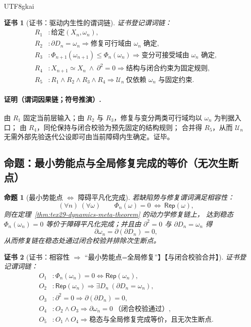 \documentclass[12pt]{article}
\newtheorem{proposition}{命题}[section]
\newtheorem{Certificate}{证书}[section]
\begin{document}
\begin{CJK*}{UTF8}{gkai}
\begin{Certificate}[证书：驱动内生性的谓词链]
\label{cert:tex29-dynamics-meta-driver}
证书登记谓词链：
\[
\begin{aligned}
  R_1 &: \text{给定}(X_n,\omega_n),\\
  R_2 &: \partial D_n=\omega_n\Rightarrow \text{修复可行域由 }\omega_n\text{ 确定},\\
  R_3 &: \Phi_{n+1}(\omega_{n+1})\le \Phi_n(\omega_n)\Rightarrow \text{变分可接受域由 }\omega_n\text{ 确定},\\
  R_4 &: X_{n+1}\simeq X_n\ \wedge\ \partial^2=0\Rightarrow \text{结构与闭合约束为固定规则},\\
  R_5 &: R_1\wedge R_2\wedge R_3\wedge R_4\Rightarrow \mathcal{U}_n\ \text{仅依赖 }\omega_n\text{ 与固定约束}.
\end{aligned}
\]
\end{Certificate}

\paragraph{证明（谓词因果链；符号推演）.}
由 $R_1$ 固定当前层输入；由 $R_2$ 与 $R_3$，修复与变分两类可行域均以 $\omega_n$ 为判据入口；
由 $R_4$，同伦保持与闭合校验为预先固定的结构规则；
合并得 $R_5$，从而 $\mathcal{U}_n$ 无需外部先验迭代公设即可由当前障碍内生确定。证毕。

\subsection{命题：最小势能点与全局修复完成的等价（无次生断点）}
\label{subsec:tex29-dynamics-meta-optimality}

\begin{proposition}[最小势能点 $\Leftrightarrow$ 障碍平凡化完成]
\label{prop:tex29-dynamics-meta-optimality}
若缺陷势与修复谓词满足相容性：
\[
  (\forall n)\ (\forall \omega)\qquad \Phi_n(\omega)=0\ \Longleftrightarrow\ \mathsf{Rep}(\omega),
\]
则在定理~\ref{thm:tex29-dynamics-meta-theorem} 的动力学修复链上，
达到稳态 $\Phi_n(\omega_n)=0$ 等价于障碍平凡化完成；并且由 $\partial^2=0$ 与 $\partial D_n=\omega_n$ 得
\[
  \partial\omega_n=\partial(\partial D_n)=0,
\]
从而修复链在稳态处通过闭合校验并排除次生断点。
\end{proposition}

\begin{Certificate}[证书：相容性 $\Rightarrow$ “最小势能点=全局修复”】【与闭合校验合并】]
\label{cert:tex29-dynamics-meta-optimality}
证书登记谓词链：
\[
\begin{aligned}
  O_1 &: \Phi_n(\omega_n)=0\Longleftrightarrow \mathsf{Rep}(\omega_n),\\
  O_2 &: \mathsf{Rep}(\omega_n)\Rightarrow \exists D_n\ (\partial D_n=\omega_n),\\
  O_3 &: \partial^2=0\Rightarrow \partial(\partial D_n)=0,\\
  O_4 &: O_2\wedge O_3\Rightarrow \partial\omega_n=0\ \text{（闭合校验通过）},\\
  O_5 &: O_1\wedge O_4\Rightarrow \text{稳态与全局修复完成等价，且无次生断点}.
\end{aligned}
\]
\end{Certificate}


\end{CJK*}
\end{document}
